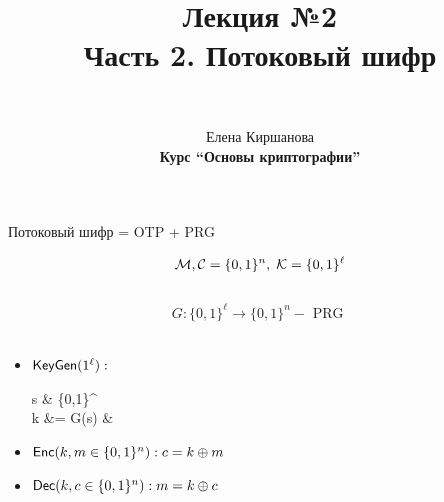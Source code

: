 \documentclass[usenames,dvipsnames,8pt,aspectratio=169]{beamer}
\author{\\ [10pt]
}
\title{Лекция №2 \\[10pt]
		Часть 2. Потоковый шифр}
\date{ Елена Киршанова \\  \textbf{Курс ``Основы криптографии''} \\  }
\begin{document}
	
\begin{frame}
	\titlepage
\end{frame}

\begin{frame}{Потоковый шифр = OTP + PRG}
\LARGE

		 \[\mathcal{M}, \mathcal{C} = \{0,1\}^n, \; \mathcal{K} = \{0,1\}^{\ell}\] \\
		 \[G : \{0,1\}^{\ell}  \rightarrow \{0,1\}^{n} - \text{ PRG } \] \\
		\begin{itemize}
			\item $\textsf{KeyGen}(1^{\ell}): $ \\[-20pt]
			\begin{flalign*} 
				s  &\xleftarrow{\$} \{0,1\}^\ell  \\
				k &= G(s)  & 
			\end{flalign*}
			\item $\textsf{Enc}(k, m \in \{0,1\}^n): c = k \oplus m$ \\[10pt]
			\item $\textsf{Dec}(k, c \in \{0,1\}^n): m = k \oplus c$ \\[10pt]
		\end{itemize}
\end{frame}
\end{document}
